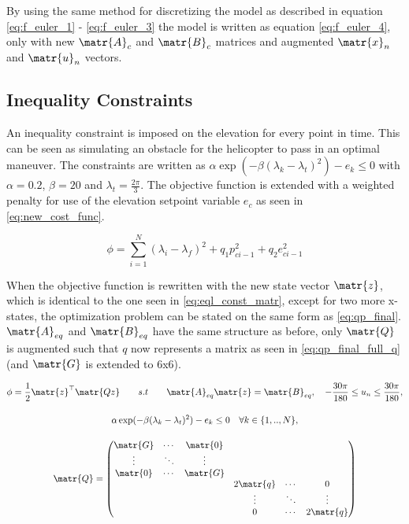 By using the same method for discretizing the model as described in equation \cref{eq:f_euler_1} - \cref{eq:f_euler_3} the model is written as equation \cref{eq:f_euler_4}, only with new $\matr{A}_c$ and $\matr{B}_c$ matrices and augmented $\matr{x}_n$ and $\matr{u}_n$ vectors.

\subsection{Inequality Constraints}
An inequality constraint is imposed on the elevation for every point in time. This can be seen as simulating an obstacle for the helicopter to pass in an optimal maneuver. The constraints are written as $\alpha \exp(-\beta(\lambda_k - \lambda_t)^2)-e_k \leq 0$ with $\alpha = 0.2$, $\beta = 20$ and $\lambda_t = \frac{2\pi}{3}$. The objective function is extended with a weighted penalty for use of the elevation setpoint variable $e_c$ as seen in \cref{eq:new_cost_func}.

\begin{equation}
    \phi = \sum_{i = 1}^{N} (\lambda_{i} - \lambda_{f})^2 + q_1p_{ci-1}^{2} + q_2e^2_{ci-1} \label{eq:new_cost_func}
\end{equation}

When the objective function is rewritten with the new state vector $\matr{z}$, which is identical to the one seen in \cref{eq:eql_const_matr}, except for two more x-states, the optimization problem can be stated on the same form as \cref{eq:qp_final}. $\matr{A}_{eq}$ and $\matr{B}_{eq}$ have the same structure as before, only $\matr{Q}$ is augmented such that $q$ now represents a matrix as seen in \cref{eq:qp_final_full_q} (and $\matr{G}$ is extended to 6x6).

\begin{subequations}\label{eq:qp_final_full}
    \begin{gather}
        \phi = \frac{1}{2}\matr{z}^\top\matr{Qz} \qquad s.t \qquad \matr{A}_{eq}\matr{z} = \matr{B}_{eq}, \quad  -\frac{30\pi}{180} \leq u_{n} \leq \frac{30\pi}{180},\\[0.4cm]
        \alpha \exp(-\beta(\lambda_k - \lambda_t)^2)-e_k \leq 0 \quad\forall k  \in  \{1,..,N\}, \\[0.4cm]
        \matr{Q}=
        \begin{pmatrix}\label{eq:qp_final_full_q}
            \matr{G} & \cdots & \matr{0} & & & \\
            \vdots & \ddots & \vdots & &  & \\
            \matr{0} & \cdots & \matr{G} & & & \\
             & & & 2\matr{q} & \cdots & 0 \\
             &  & & \vdots & \ddots & \vdots \\
             & & & 0 & \cdots & 2\matr{q}
        \end{pmatrix}
    \end{gather}
\end{subequations}

